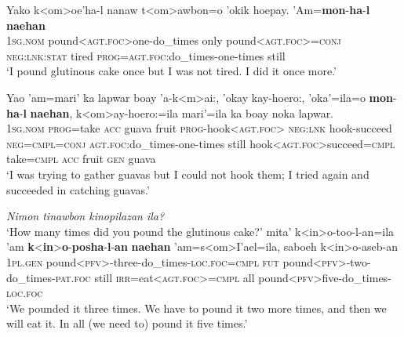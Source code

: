 \begin{exe}
	\ex\label{exAppendixSaisiyatIterativeViaIncrement1}
	\gll Yako k<om>oe'ha-l nanaw t<om>awbon=o 'okik hoepay. 'Am=\textbf{mon}-\textbf{ha}-\textbf{l} \textbf{naehan}\\
	1\textsc{sg}.\textsc{nom} pound<\textsc{agt}.\textsc{foc}>one-do\_times only pound<\textsc{agt}.\textsc{foc}>=\textsc{conj} \textsc{neg}:\textsc{lnk}:\textsc{stat} tired \textsc{prog}=\textsc{agt}.\textsc{foc}:do\_times-one-times still\\
	\glt \lq I pound glutinous cake once but I was not tired. I did it once more.' \parencite[530]{ZeitounEtal2015}
	
	\ex\label{exAppendixSaisiyatIterativeViaIncrement2}
	\gll Yao \rq{}am=mari’ ka lapwar boay \rq{}a-k<m>ai:, \rq{}okay kay-hoero:, \rq{}oka\rq{}=ila=o \textbf{mon}-\textbf{ha}-\textbf{l} \textbf{naehan}, k<om>ay-hoero:=ila mari\rq{}=ila ka boay noka lapwar.\\
1\textsc{sg}.\textsc{nom} \textsc{prog}=take \textsc{acc} guava fruit \textsc{prog}-hook<\textsc{agt}.\textsc{foc}> \textsc{neg}:\textsc{lnk} hook-succeed \textsc{neg}=\textsc{cmpl}=\textsc{conj} \textsc{agt}.\textsc{foc}:do\_times-one-times still hook<\textsc{agt}.\textsc{foc}>succeed=\textsc{cmpl} take=\textsc{cmpl} \textsc{acc} fruit \textsc{gen} guava\\
\glt \lq I was trying to gather guavas but I could not hook them; I tried again and succeeded in catching guavas.'  \parencite[524]{ZeitounEtal2015}

\ex\label{exAppendixSaisiyatIterativeViaIncrement3}
	\begin{xlist}
	\textit{Nimon tinawbon kinopilazan ila?}\\
	\lq  How many times did you pound the glutinous cake?\rq{}
		\gll mita' k<in>o-too-l-an=ila 'am \textbf{k}<\textbf{in}>\textbf{o}-\textbf{posha}-\textbf{l}-\textbf{an} \textbf{naehan} 'am=s<om>I’ael=ila, saboeh k<in>o-aseb-an\\
		1\textsc{pl}.\textsc{gen} pound<\textsc{pfv}>-three-do\_times-\textsc{loc}.\textsc{foc}=\textsc{cmpl} \textsc{fut} pound<\textsc{pfv}>-two-do\_times-\textsc{pat}.\textsc{foc} still \textsc{irr}=eat<\textsc{agt}.\textsc{foc}>=\textsc{cmpl} all pound<\textsc{pfv}>five-do\_times-\textsc{loc}.\textsc{foc}\\
		\glt \lq We pounded it three times. We have to pound it two more times, and then we will eat it. In all (we need to) pound it five times.' \parencite[530]{ZeitounEtal2015}
	\end{xlist}
\end{exe}

